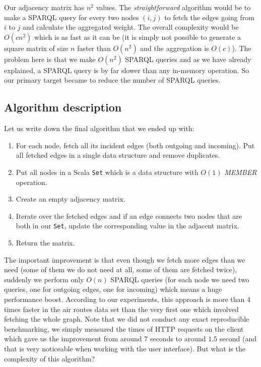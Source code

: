 Our adjacency matrix has $n^2$ values. The \emph{straightforward} algorithm would be to make a SPARQL query for every two nodes $(i, j)$ to fetch the edges going from $i$ to $j$ and calculate the aggregated weight. The overall complexity would be $O(cn^2)$ which is as fast as it can be (it is simply not possible to generate a square matrix of size $n$ faster than $O(n^2)$  and the aggregation is $O(c)$). The problem here is that we make $O(n^2)$ SPARQL queries and as we have already explained, a SPARQL query is by far slower than any in-memory operation. So our primary target became to reduce the number of SPARQL queries.

\subsection{Algorithm description}

Let us write down the final algorithm that we ended up with:

\begin{enumerate}
\item For each node, fetch all its incident edges (both outgoing and incoming). Put all fetched edges in a single data structure and remove duplicates.
\item Put all nodes in a Scala \texttt{Set} which is a data structure with $O(1)$  \emph{MEMBER} operation.
\item Create an empty adjacency matrix.
\item Iterate over the fetched edges and if an edge connects two nodes that are both in our \texttt{Set}, update the corresponding value in the adjacent matrix.
\item Return the matrix.
\end{enumerate}

The important improvement is that even though we fetch more edges than we need (some of them we do not need at all, some of them are fetched twice), suddenly we perform only $O(n)$ SPARQL queries (for each node we need two queries, one for outgoing edges, one for incoming) which means a huge performance boost. According to our experiments, this approach is more than 4 times faster in the air routes data set than the very first one which involved fetching the whole graph. Note that we did not conduct any exact reproducible benchmarking, we simply measured the times of HTTP requests on the client which gave us the improvement from around $7$ seconds to around $1.5$ second (and that is very noticeable when working with the user interface). But what is the complexity of this algorithm?

